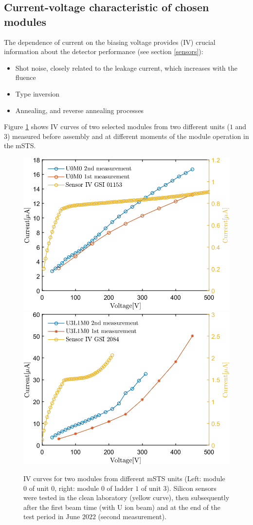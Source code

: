 \subsection{Current-voltage characteristic of chosen modules}
The dependence of current on the biasing voltage provides (IV) crucial information about the detector performance (see section \ref{sensors}):
\begin{itemize}
    \item Shot noise, closely related to the leakage current, which increases with the fluence
    \item Type inversion
    \item Annealing, and reverse annealing processes
\end{itemize}
Figure \ref{fig_IV} shows IV curves of two selected modules from two different units ($1$ and $3$) measured before assembly and at different moments of the module operation in the \gls{mSTS}.
\begin{figure}[!h]
\centering
\includegraphics[width=0.48\columnwidth]{Chapter6/DCS/images/IV/U0FEB1.png}
\includegraphics[width=0.48\columnwidth]{Chapter6/DCS/images/IV/U3L1FEB1.png}
\caption{IV curves for two modules from different \gls{mSTS} units (Left: module $0$ of unit $0$, right: module $0$ of ladder $1$ of unit $3$). Silicon sensors were tested in the clean laboratory (yellow curve), then subsequently after the first beam time (with U ion beam) and at the end of the test period in June $2022$ (second measurement).}
\label{fig_IV}
\end{figure}
